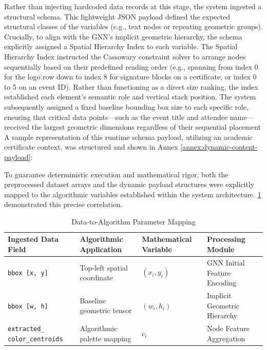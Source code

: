 \begin{refsection}
Rather than injecting hardcoded data records at this stage, the system ingested a structural schema. This lightweight JSON payload defined the expected structural classes of the variables (e.g., text nodes or repeating geometric groups). Crucially, to align with the GNN’s implicit geometric hierarchy, the schema explicitly assigned a Spatial Hierarchy Index to each variable. The Spatial Hierarchy Index instructed the Cassowary constraint solver to arrange nodes sequentially based on their predefined reading order (e.g., spanning from index 0 for the logo row down to index 8 for signature blocks on a certificate, or index 0 to 5 on an event ID). Rather than functioning as a direct size ranking, the index established each element's semantic role and vertical stack position. The system subsequently assigned a fixed baseline bounding box size to each specific role, ensuring that critical data points—such as the event title and attendee name—received the largest geometric dimensions regardless of their sequential placement A sample representation of this runtime schema payload, utilizing an academic certificate context, was structured and shown in Annex \ref{annex:dynamic-content-payload}:




To guarantee deterministic execution and mathematical rigor, both the preprocessed dataset arrays and the dynamic payload structures were explicitly mapped to the algorithmic variables established within the system architecture. \ref{tab:ingested-data-fields} demonstrated this precise correlation.

\begin{table}[ht]
\centering
\caption{Data-to-Algorithm Parameter Mapping}
\label{tab:ingested-data-fields}
\begin{tabular}{p{} p{} p{} p{}}
\hline
\textbf{Ingested Data Field} & \centering\textbf{Algorithmic Application} & \centering\textbf{Mathematical Variable} & \centering\textbf{Processing Module}\arraybackslash \\ \hline

\texttt{bbox [x, y]} 
& Top-left spatial coordinate 
& $(x_i, y_i)$ 
& GNN Initial Feature Encoding \\

\texttt{bbox [w, h]} 
& Baseline geometric tensor 
& $(w_i, h_i)$ 
& Implicit Geometric Hierarchy \\

\texttt{extracted\_ color\_centroids} 
& Algorithmic palette mapping 
& $c_i$ 
& Node Feature Aggregation \\


\end{tabular}
\end{table}
\end{refsection}
